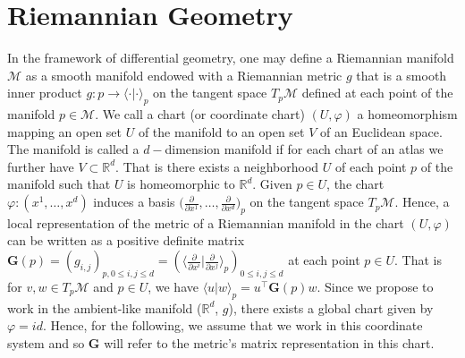 \documentclass[10pt,journal,compsoc]{IEEEtran}
\begin{document}


\clearpage
\appendices
\section{Riemannian Geometry}\label{appendix A}

In the framework of differential geometry, one may define a Riemannian manifold $\mathcal{M}$ as a smooth manifold endowed with a Riemannian metric $g$ that is a smooth inner product $g: p \to \langle \cdot | \cdot \rangle_p$ on the tangent space $T_p\mathcal{M}$ defined at each point of the manifold $p \in \mathcal{M}$. We call a chart (or coordinate chart) $(U, \varphi)$ a homeomorphism mapping an open set $U$ of the manifold to an open set $V$ of an Euclidean space.  The manifold is called a $d-$dimension manifold if for each chart of an atlas we further have $V \subset \mathbb{R}^d$. That is there exists a neighborhood $U$ of each point $p$ of the manifold such that $U$ is homeomorphic to $\mathbb{R}^d$. Given $p \in U$, the chart $\varphi: (x^1, \dots, x^d)$ induces a basis $\Big (\frac{\partial}{\partial x^1}, \dots, \frac{\partial}{\partial x^d} \Big)_p $ on the tangent space $T_p\mathcal{M}$. Hence, a local representation of the metric of a Riemannian manifold in the chart $(U,\varphi)$ can be written as a positive definite matrix $\mathbf{G}(p) = ( g_{i, j})_{p, 0 \leq i, j \leq d} = (\langle \frac{\partial}{\partial x^i} | \frac{\partial}{\partial x^j} \rangle_p)_{0 \leq i, j \leq d}$ at each point $p \in U$. That is for $v, w \in T_p\mathcal{M}$ and $p \in U$, we have $\langle u | w \rangle_p = u^{\top} \mathbf{G}(p) w$. Since we propose to work in the ambient-like manifold ($\mathbb{R}^d$, $g$), there exists a global chart given by $\varphi=id$. Hence, for the following, we assume that we work in this coordinate system and so $\mathbf{G}$  will refer to the metric's matrix representation in this chart.
\end{document}
